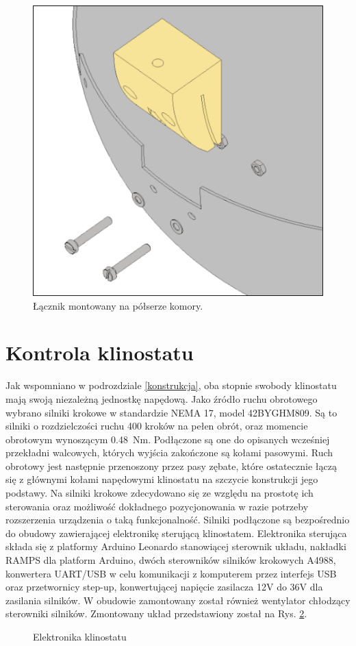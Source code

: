 \begin{figure}
	
	\centering
	\includegraphics[scale=.25]{bottom_half_connector_framed}
	\caption{Łącznik montowany na półserze komory.} 
	\label{fig:łącznik_globus}
	
\end{figure}

\section{Kontrola klinostatu}

Jak wspomniano w podrozdziale \ref{konstrukcja}, oba stopnie swobody klinostatu mają swoją niezależną jednostkę napędową. Jako źródło ruchu obrotowego wybrano silniki krokowe w standardzie NEMA 17, model 42BYGHM809. Są to silniki o rozdzielczości ruchu 400 kroków na pełen obrót, oraz momencie obrotowym wynoszącym \SI{0,48}{Nm}. Podłączone są one do opisanych wcześniej przekładni walcowych, których wyjścia zakończone są kołami pasowymi. Ruch obrotowy jest następnie przenoszony przez pasy zębate, które ostatecznie łączą się z głównymi kołami napędowymi klinostatu na szczycie konstrukcji jego podstawy. Na silniki krokowe zdecydowano się ze względu na prostotę ich sterowania oraz możliwość dokładnego pozycjonowania w razie potrzeby rozszerzenia urządzenia o taką funkcjonalność. Silniki podłączone są bezpośrednio do obudowy zawierającej elektronikę sterującą klinostatem. Elektronika sterująca składa się z platformy Arduino Leonardo stanowiącej sterownik układu, nakładki RAMPS dla platform Arduino, dwóch sterowników silników krokowych A4988, konwertera UART/USB w celu komunikacji z komputerem przez interfejs USB oraz przetwornicy step-up, konwertującej napięcie zasilacza 12V do 36V dla zasilania silników. W obudowie zamontowany został również wentylator chłodzący sterowniki silników. Zmontowany układ przedstawiony został na Rys. \ref{fig:elektronika}. 

\begin{figure}[ht]
	\centering
	\setlength{\fboxsep}{0pt}
	\setlength{\fboxrule}{1pt}
	\caption{Elektronika klinostatu} 
	\label{fig:elektronika}
\end{figure}